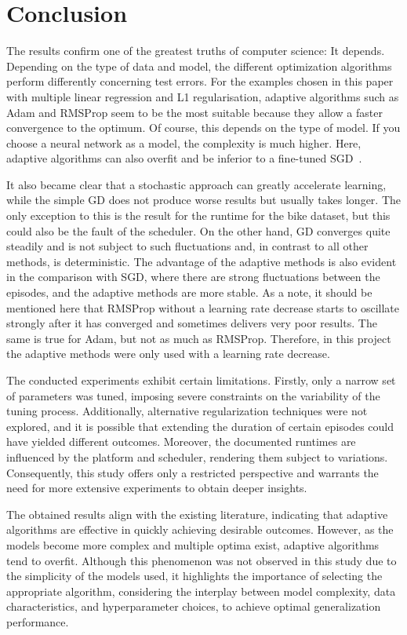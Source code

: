 \documentclass[10pt,conference,compsocconf]{IEEEtran}
\begin{document}
\section{Conclusion}
The results confirm one of the greatest truths of computer science: It depends. 
Depending on the type of data and model, the different optimization algorithms perform differently concerning test errors.  
For the examples chosen in this paper with multiple linear regression and L1 regularisation, adaptive algorithms such as Adam and RMSProp seem to be the most suitable because they allow a faster convergence to the optimum. 
Of course, this depends on the type of model. 
If you choose a neural network as a model, the complexity is much higher. 
Here, adaptive algorithms can also overfit and be inferior to a fine-tuned SGD~\cite{wilson2018marginal}.

It also became clear that a stochastic approach can greatly accelerate learning, while the simple GD does not produce worse results but usually takes longer. 
The only exception to this is the result for the runtime for the bike dataset, but this could also be the fault of the scheduler.
On the other hand, GD converges quite steadily and is not subject to such fluctuations and, in contrast to all other methods, is deterministic.
The advantage of the adaptive methods is also evident in the comparison with SGD, where there are strong fluctuations between the episodes, and the adaptive methods are more stable.
As a note, it should be mentioned here that RMSProp without a learning rate decrease starts to oscillate strongly after it has converged and sometimes delivers very poor results. 
The same is true for Adam, but not as much as RMSProp. 
Therefore, in this project the adaptive methods were only used with a learning rate decrease.

The conducted experiments exhibit certain limitations. 
Firstly, only a narrow set of parameters was tuned, imposing severe constraints on the variability of the tuning process. 
Additionally, alternative regularization techniques were not explored, and it is possible that extending the duration of certain episodes could have yielded different outcomes. 
Moreover, the documented runtimes are influenced by the platform and scheduler, rendering them subject to variations. 
Consequently, this study offers only a restricted perspective and warrants the need for more extensive experiments to obtain deeper insights.

The obtained results align with the existing literature, indicating that adaptive algorithms are effective in quickly achieving desirable outcomes. 
However, as the models become more complex and multiple optima exist, adaptive algorithms tend to overfit.
Although this phenomenon was not observed in this study due to the simplicity of the models used, it highlights the importance of selecting the appropriate algorithm, considering the interplay between model complexity, data characteristics, and hyperparameter choices, to achieve optimal generalization performance.
\end{document}

